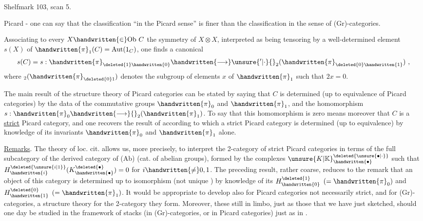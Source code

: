 Shelfmark 103, scan 5.


Picard - one can say that the classification ``in the Picard sense'' is finer than the classification in the sense of (Gr)-categories. 

Associating to every $X\handwritten{\in}\mathrm{Ob}\ C$ the symmetry of $X\otimes X$, interpreted as  being tensoring by a well-determined element $s(X)$ of $\handwritten{\pi}_{1}(C)=\mathrm{Aut}(1_C)$, one finds a canonical 
\[
s(C)=s:\handwritten{\pi}_{\deleted{1}\handwritten{0}}\handwritten{\longrightarrow}\unsure{{}'|\cdot}{}_{2}(\handwritten{\pi}_{\deleted{0}\handwritten{1}})\ ,
\]
where $ {}_{2}(\handwritten{\pi}_{\deleted{0}1})$ denotes the subgroup of elements $x$ of $\handwritten{\pi}_{1}$ such that $2x=0$.

The main result of the structure theory of Picard categories can be stated by saying that $C$ is determined (up to  equivalence of Picard categories) by the data of the commutative groups $\handwritten{\pi}_{0}$ and $\handwritten{\pi}_{1}$, and the homomorphism $s:\handwritten{\pi}_{0}\handwritten{\longrightarrow}{}_{2}(\handwritten{\pi}_{1})$. To say that this homomorphism is zero means moreover that $C$ is a \uline{strict} Picard category, and one recovers the result of \handwritten{[\, ]} according to which a strict Picard category is determined (up to equivalence) by knowledge of its invariants $\handwritten{\pi}_{0}$ and $\handwritten{\pi}_{1}$ alone.

\uline{Remarks}. The theory of loc. cit. allows us, more precisely, to interpret the 2-category of strict Picard categories in terms of the full subcategory of the derived category of (Ab) (cat. of abelian groups), formed by the complexes ${\unsure{K|\mathbb{K}}}^{\deleted{\unsure{\bullet|\cdot}}}_{\handwritten{\bullet}}$ such that $H^{\deleted{\unsure{i|1}}}_{\handwritten{i}}(K^{\deleted{\bullet}}_{\handwritten{\bullet}})=0$ for $i\handwritten{\ne}0,1$. The preceding result, rather coarse, reduces  to the remark that an object of this category is determined up to isomorphism (not unique \handwritten{!}) by knowledge of its $H^{\deleted{1}}_{\handwritten{0}}$ $(=\handwritten{\pi}_{0})$ and $H^{\deleted{0}}_{\handwritten{1}}$ $(=\handwritten{\pi}_{1})$. It would be appropriate to develop also for Picard categories not necessarily strict, and for (Gr)-categories, a structure theory for the 2-category they form. Moreover, these  still in limbo, just as those that  we have just sketched, should one day be  studied in the framework of stacks (in (Gr)-categories, or in Picard categories) just as in  \handwritten{[\, ]}.

